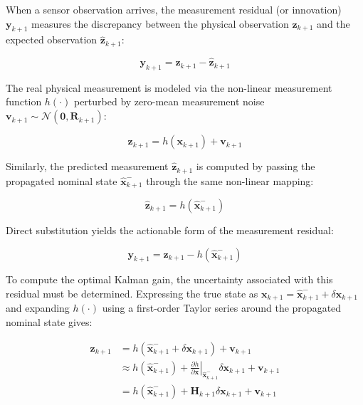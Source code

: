 \documentclass{article}
\begin{document}
	When a sensor observation arrives, the measurement residual (or innovation) $\mathbf{y}_{k+1}$ measures the discrepancy between the physical observation $\mathbf{z}_{k+1}$ and the expected observation $\hat{\mathbf{z}}_{k+1}$:
	
	\begin{equation}
		\mathbf{y}_{k+1} = \mathbf{z}_{k+1} - \hat{\mathbf{z}}_{k+1}
	\end{equation}
	
	The real physical measurement is modeled via the non-linear measurement function $h(\cdot)$ perturbed by zero-mean measurement noise $\mathbf{v}_{k+1} \sim \mathcal{N}(\mathbf{0}, \mathbf{R}_{k+1})$:
	
	\begin{equation}
		\mathbf{z}_{k+1} = h(\mathbf{x}_{k+1}) + \mathbf{v}_{k+1}
	\end{equation}
	
	Similarly, the predicted measurement $\hat{\mathbf{z}}_{k+1}$ is computed by passing the propagated nominal state $\hat{\mathbf{x}}_{k+1}^-$ through the same non-linear mapping:
	
	\begin{equation}
		\hat{\mathbf{z}}_{k+1} = h(\hat{\mathbf{x}}_{k+1}^-)
	\end{equation}
	
	Direct substitution yields the actionable form of the measurement residual:
	
	\begin{equation}
		\mathbf{y}_{k+1} = \mathbf{z}_{k+1} - h(\hat{\mathbf{x}}_{k+1}^-)
	\end{equation}
	
	To compute the optimal Kalman gain, the uncertainty associated with this residual must be determined. Expressing the true state as $\mathbf{x}_{k+1} = \hat{\mathbf{x}}_{k+1}^- + \delta\mathbf{x}_{k+1}$ and expanding $h(\cdot)$ using a first-order Taylor series around the propagated nominal state gives:
	
	\begin{align}
		\mathbf{z}_{k+1} &= h(\hat{\mathbf{x}}_{k+1}^- + \delta\mathbf{x}_{k+1}) + \mathbf{v}_{k+1} \nonumber \\
		&\approx h(\hat{\mathbf{x}}_{k+1}^-) + \left. \frac{\partial h}{\partial \mathbf{x}} \right|_{\hat{\mathbf{x}}_{k+1}^-} \delta\mathbf{x}_{k+1} + \mathbf{v}_{k+1} \nonumber \\
		&= h(\hat{\mathbf{x}}_{k+1}^-) + \mathbf{H}_{k+1} \delta\mathbf{x}_{k+1} + \mathbf{v}_{k+1}
	\end{align}
	
\end{document}
